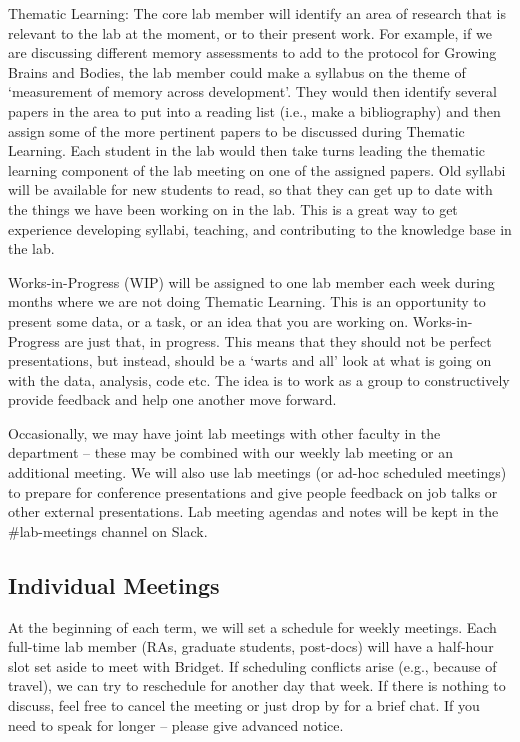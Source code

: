\documentclass[]{book}
\begin{document}
Thematic Learning: The core lab member will identify an area of research that is relevant to the lab at the moment, or to their present work. For example, if we are discussing different memory assessments to add to the protocol for Growing Brains and Bodies, the lab member could make a syllabus on the theme of `measurement of memory across development'. They would then identify several papers in the area to put into a reading list (i.e., make a bibliography) and then assign some of the more pertinent papers to be discussed during Thematic Learning. Each student in the lab would then take turns leading the thematic learning component of the lab meeting on one of the assigned papers. Old syllabi will be available for new students to read, so that they can get up to date with the things we have been working on in the lab. This is a great way to get experience developing syllabi, teaching, and contributing to the knowledge base in the lab.

Works-in-Progress (WIP) will be assigned to one lab member each week during months where we are not doing Thematic Learning. This is an opportunity to present some data, or a task, or an idea that you are working on. Works-in-Progress are just that, in progress. This means that they should not be perfect presentations, but instead, should be a `warts and all' look at what is going on with the data, analysis, code etc. The idea is to work as a group to constructively provide feedback and help one another move forward.

Occasionally, we may have joint lab meetings with other faculty in the department -- these may be combined with our weekly lab meeting or an additional meeting. We will also use lab meetings (or ad-hoc scheduled meetings) to prepare for conference presentations and give people feedback on job talks or other external presentations. Lab meeting agendas and notes will be kept in the \#lab-meetings channel on Slack.

\hypertarget{individual-meetings}{%
\subsection{Individual Meetings}\label{individual-meetings}}

At the beginning of each term, we will set a schedule for weekly meetings. Each full-time lab member (RAs, graduate students, post-docs) will have a half-hour slot set aside to meet with Bridget. If scheduling conflicts arise (e.g., because of travel), we can try to reschedule for another day that week. If there is nothing to discuss, feel free to cancel the meeting or just drop by for a brief chat. If you need to speak for longer -- please give advanced notice.
\end{document}
